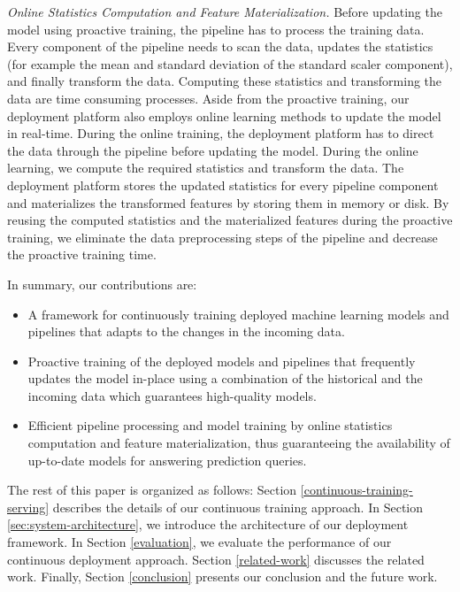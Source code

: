 \textit{Online Statistics Computation and Feature Materialization.}
Before updating the model using proactive training, the pipeline has to process the training data.
Every component of the pipeline needs to scan the data, updates the statistics (for example the mean and standard deviation of the standard scaler component), and finally transform the data.
Computing these statistics and transforming the data are time consuming processes.
Aside from the proactive training, our deployment platform also employs online learning methods to update the model in real-time.
During the online training, the deployment platform has to direct the data through the pipeline before updating the model.
During the online learning, we compute the required statistics and transform the data.
The deployment platform stores the updated statistics for every pipeline component and materializes the transformed features by storing them in memory or disk.
By reusing the computed statistics and the materialized features during the proactive training, we eliminate the data preprocessing steps of the pipeline and decrease the proactive training time.

In summary, our contributions are:
\begin{itemize}
\item A framework for continuously training deployed machine learning models and pipelines that adapts to the changes in the incoming data.
\item Proactive training of the deployed models and pipelines that frequently updates the model in-place using a combination of the historical and the incoming data which guarantees high-quality models.
\item Efficient pipeline processing and model training by online statistics computation and feature materialization, thus guaranteeing the availability of up-to-date models for answering prediction queries.
\end{itemize}

The rest of this paper is organized as follows:
Section \ref{continuous-training-serving} describes the details of our continuous training approach.
In Section \ref{sec:system-architecture}, we introduce the architecture of our deployment framework.
In Section \ref{evaluation}, we evaluate the performance of our continuous deployment approach.
Section \ref {related-work} discusses the related work.
Finally, Section \ref{conclusion} presents our conclusion and the future work.